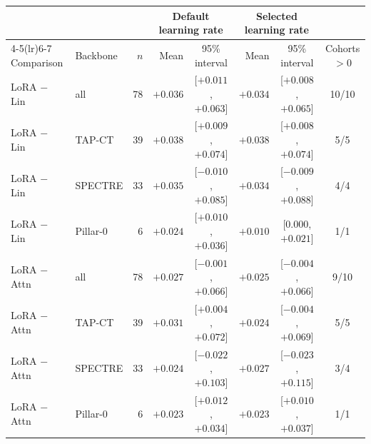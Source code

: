 \begin{tabular}{llrrcrcc}
\toprule
 & & & \multicolumn{2}{c}{Default learning rate} & \multicolumn{2}{c}{Selected learning rate} & \\
\cmidrule(lr){4-5}\cmidrule(lr){6-7}
Comparison & Backbone & $n$ & Mean & 95\% interval & Mean & 95\% interval & Cohorts $>0$ \\
\midrule
LoRA $-$ Lin & all & 78 & $+0.036$ & [$+0.011$, $+0.063$] & $+0.034$ & [$+0.008$, $+0.065$] & 10/10 \\
LoRA $-$ Lin & TAP-CT & 39 & $+0.038$ & [$+0.009$, $+0.074$] & $+0.038$ & [$+0.008$, $+0.074$] & 5/5 \\
LoRA $-$ Lin & SPECTRE & 33 & $+0.035$ & [$-0.010$, $+0.085$] & $+0.034$ & [$-0.009$, $+0.088$] & 4/4 \\
LoRA $-$ Lin & Pillar-0 & 6 & $+0.024$ & [$+0.010$, $+0.036$] & $+0.010$ & [$0.000$, $+0.021$] & 1/1 \\
LoRA $-$ Attn & all & 78 & $+0.027$ & [$-0.001$, $+0.066$] & $+0.025$ & [$-0.004$, $+0.066$] & 9/10 \\
LoRA $-$ Attn & TAP-CT & 39 & $+0.031$ & [$+0.004$, $+0.072$] & $+0.024$ & [$-0.004$, $+0.069$] & 5/5 \\
LoRA $-$ Attn & SPECTRE & 33 & $+0.024$ & [$-0.022$, $+0.103$] & $+0.027$ & [$-0.023$, $+0.115$] & 3/4 \\
LoRA $-$ Attn & Pillar-0 & 6 & $+0.023$ & [$+0.012$, $+0.034$] & $+0.023$ & [$+0.010$, $+0.037$] & 1/1 \\
\bottomrule
\end{tabular}
